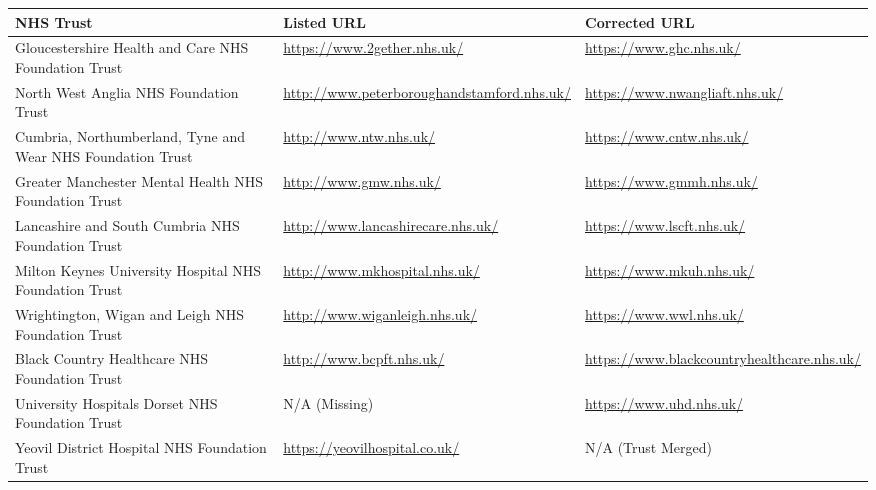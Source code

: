 \begin{center}\label{tab:url_corrections}
    \begin{tabularx}{\textwidth}{p{10em} p{13em} X}
        NHS Trust & Listed URL & Corrected URL \\
        \midrule
        Gloucestershire Health and Care NHS Foundation Trust 
        & \url{https://www.2gether.nhs.uk/}
        & \url{https://www.ghc.nhs.uk/} \\
        North West Anglia NHS Foundation Trust 
        & \url{http://www.peterboroughandstamford.nhs.uk/} 
        & \url{https://www.nwangliaft.nhs.uk/} \\
        Cumbria, Northumberland, Tyne and Wear NHS Foundation Trust 
        & \url{http://www.ntw.nhs.uk/}
        & \url{https://www.cntw.nhs.uk/} \\
        Greater Manchester Mental Health NHS Foundation Trust 
        & \url{http://www.gmw.nhs.uk/}
        & \url{https://www.gmmh.nhs.uk/} \\
        Lancashire and South Cumbria NHS Foundation Trust 
        & \url{http://www.lancashirecare.nhs.uk/}
        & \url{https://www.lscft.nhs.uk/} \\
        Milton Keynes University Hospital NHS Foundation Trust 
        & \url{http://www.mkhospital.nhs.uk/} 
        & \url{https://www.mkuh.nhs.uk/} \\
        Wrightington, Wigan and Leigh NHS Foundation Trust 
        & \url{http://www.wiganleigh.nhs.uk/} 
        & \url{https://www.wwl.nhs.uk/} \\
        Black Country Healthcare NHS Foundation Trust 
        & \url{http://www.bcpft.nhs.uk/} 
        & \url{https://www.blackcountryhealthcare.nhs.uk/} \\
        University Hospitals Dorset NHS Foundation Trust 
        & N/A (Missing)
        & \url{https://www.uhd.nhs.uk/} \\ 
        Yeovil District Hospital NHS Foundation Trust 
        & \url{https://yeovilhospital.co.uk/}
        & N/A (Trust Merged) \\
        \bottomrule
    \end{tabularx}
\end{center}
